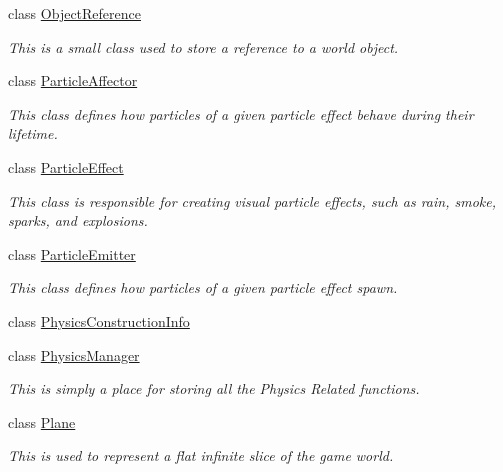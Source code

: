 \begin{DoxyCompactItemize}
class \hyperlink{classMezzanine_1_1ObjectReference}{ObjectReference}
\begin{DoxyCompactList}\small\item\em This is a small class used to store a reference to a world object. \item\end{DoxyCompactList}\item 
class \hyperlink{classMezzanine_1_1ParticleAffector}{ParticleAffector}
\begin{DoxyCompactList}\small\item\em This class defines how particles of a given particle effect behave during their lifetime. \item\end{DoxyCompactList}\item 
class \hyperlink{classMezzanine_1_1ParticleEffect}{ParticleEffect}
\begin{DoxyCompactList}\small\item\em This class is responsible for creating visual particle effects, such as rain, smoke, sparks, and explosions. \item\end{DoxyCompactList}\item 
class \hyperlink{classMezzanine_1_1ParticleEmitter}{ParticleEmitter}
\begin{DoxyCompactList}\small\item\em This class defines how particles of a given particle effect spawn. \item\end{DoxyCompactList}\item 
class \hyperlink{classMezzanine_1_1PhysicsConstructionInfo}{PhysicsConstructionInfo}
\item 
class \hyperlink{classMezzanine_1_1PhysicsManager}{PhysicsManager}
\begin{DoxyCompactList}\small\item\em This is simply a place for storing all the Physics Related functions. \item\end{DoxyCompactList}\item 
class \hyperlink{classMezzanine_1_1Plane}{Plane}
\begin{DoxyCompactList}\small\item\em This is used to represent a flat infinite slice of the game world. \item\end{DoxyCompactList}\item 

\end{DoxyCompactItemize}
